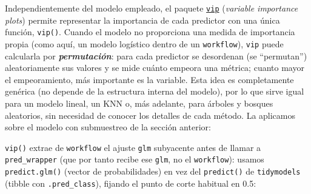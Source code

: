 \documentclass[
]{book}
\newenvironment{Shaded}{\begin{snugshade}}{\end{snugshade}}
\newcommand{\AttributeTok}[1]{\textcolor[rgb]{0.13,0.29,0.53}{#1}}
\newcommand{\ControlFlowTok}[1]{\textcolor[rgb]{0.13,0.29,0.53}{\textbf{#1}}}
\newcommand{\DecValTok}[1]{\textcolor[rgb]{0.00,0.00,0.81}{#1}}
\newcommand{\FloatTok}[1]{\textcolor[rgb]{0.00,0.00,0.81}{#1}}
\newcommand{\FunctionTok}[1]{\textcolor[rgb]{0.13,0.29,0.53}{\textbf{#1}}}
\newcommand{\NormalTok}[1]{#1}
\newcommand{\OtherTok}[1]{\textcolor[rgb]{0.56,0.35,0.01}{#1}}
\newcommand{\SpecialCharTok}[1]{\textcolor[rgb]{0.81,0.36,0.00}{\textbf{#1}}}
\newcommand{\StringTok}[1]{\textcolor[rgb]{0.31,0.60,0.02}{#1}}
\theoremstyle{break}
\theoremstyle{nonumberplain}
\begin{document}
Independientemente del modelo empleado, el paquete \href{https://koalaverse.github.io/vip}{\texttt{vip}} (\emph{variable importance plots}) permite representar la importancia de cada predictor con una única función, \texttt{vip()}. Cuando el modelo no proporciona una medida de importancia propia (como aquí, un modelo logístico dentro de un \texttt{workflow}), \texttt{vip} puede calcularla por \textbf{\emph{permutación}}: para cada predictor se desordenan (se ``permutan'') aleatoriamente sus valores y se mide cuánto empeora una métrica; cuanto mayor el empeoramiento, más importante es la variable. Esta idea es completamente genérica (no depende de la estructura interna del modelo), por lo que sirve igual para un modelo lineal, un KNN o, más adelante, para árboles y bosques aleatorios, sin necesidad de conocer los detalles de cada método. La aplicamos sobre el modelo con submuestreo de la sección anterior:

\texttt{vip()} extrae de \texttt{workflow} el ajuste \texttt{glm} subyacente antes de llamar a \texttt{pred\_wrapper} (que por tanto recibe ese \texttt{glm}, no el \texttt{workflow}): usamos \texttt{predict.glm()} (vector de probabilidades) en vez del \texttt{predict()} de \texttt{tidymodels} (tibble con \texttt{.pred\_class}), fijando el punto de corte habitual en 0.5:

\begin{Shaded}
\end{Shaded}
\end{document}
